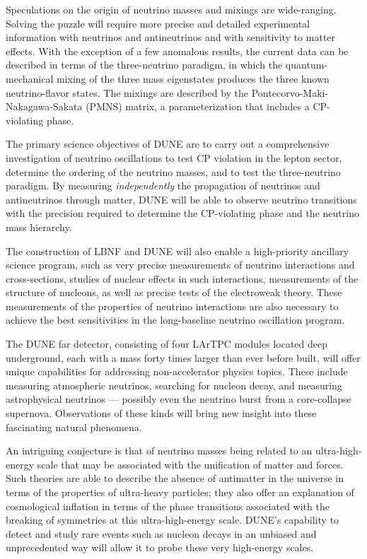 Speculations on the origin of neutrino masses and mixings are wide-ranging. 
Solving the puzzle will require more precise and detailed experimental information with neutrinos and antineutrinos and with sensitivity to matter effects. With the exception of a few anomalous results, the current data can be described in terms of the three-neutrino paradigm, in which the 
quantum-mechanical mixing of the three mass eigenstates produces the three known neutrino-flavor states.  The mixings are described by the Pontecorvo-Maki-Nakagawa-Sakata (PMNS) matrix, a parameterization that includes a CP-violating phase. 

The primary science objectives  
of DUNE are to carry out a comprehensive investigation of neutrino oscillations to test CP violation in the lepton sector, determine the ordering of the neutrino masses, and to test the three-neutrino paradigm.
By measuring \textit{independently} the  propagation of neutrinos and antineutrinos through matter, DUNE will be able to observe neutrino transitions with the precision required to determine the 
CP-violating phase and  
the neutrino mass hierarchy.

The construction of LBNF and DUNE will also enable a high-priority ancillary science program, such as 
very precise measurements of neutrino interactions and cross-sections, studies of nuclear effects in such interactions, measurements of the structure of nucleons, as well as precise tests of the electroweak theory. 
These measurements of the properties of neutrino interactions are also necessary 
to achieve the best sensitivities in the long-baseline neutrino oscillation program. 

The DUNE far detector, consisting of four LArTPC modules located deep underground, each with a mass forty times larger than ever before built,  
will offer unique capabilities for addressing 
non-accelerator physics topics. These include measuring atmospheric neutrinos, searching for nucleon decay, and measuring astrophysical neutrinos --- possibly even the neutrino burst from a core-collapse supernova. 
Observations of these kinds will bring new insight into these fascinating natural phenomena. 


An intriguing conjecture is that of neutrino masses being related to an 
ultra-high-energy scale that may be associated with the unification of matter and forces. Such theories are able to describe the absence of antimatter in the universe in terms of the properties of ultra-heavy particles; they also  
offer an explanation  
of cosmological inflation in terms of the phase transitions associated with the breaking of symmetries at this ultra-high-energy scale. DUNE's capability to detect and study rare events such as nucleon decays in an unbiased and unprecedented way will allow it to probe these very high-energy scales. 


